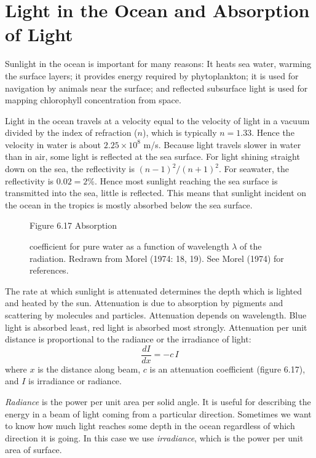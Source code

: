 \section{Light in the Ocean and Absorption of Light}
Sunlight in the ocean is
important for many reasons: It heats sea water, warming the
surface layers; it provides energy required by phytoplankton; it
is used for navigation by animals near the surface; and reflected
subsurface light is used for mapping chlorophyll concentration
from space.

Light in the ocean travels at a velocity equal to the velocity of light in a
vacuum divided by the index of refraction ($n$), which is typically $n = 1.33$.
Hence the velocity in water is about $2.25 \times 10^8$ m/s. Because light
travels slower in water than in air, some light is reflected at the sea surface.
For light shining straight down on the sea, the reflectivity is $(n - 1)^2 /(n +
1)^2 $. For seawater, the reflectivity is $0.02 = 2$\%. Hence most sunlight
reaching the sea surface is transmitted into the sea, little is reflected. This
means that sunlight incident on the ocean in the tropics is mostly absorbed
below the sea surface.

\begin{figure}[t!]
\centering
{}
\footnotesize
Figure 6.17 Absorption \rule{0mm}{3ex}coefficient for pure water as a function of wavelength
$\lambda$ of the radiation. Redrawn from Morel (1974: 18, 19). See Morel (1974) for references.

\label{fig:attenuation}
\vspace{-4ex}
\end{figure}

The rate at which sunlight is attenuated determines the depth which is
lighted and heated by the sun. Attenuation is due to absorption by pigments and
scattering by molecules and particles. Attenuation depends on wavelength.
Blue light is absorbed least, red light is absorbed most strongly.
Attenuation per unit distance is proportional to the radiance or the irradiance of
light:
\begin{equation}
\frac{dI}{dx} = -c \, I
\end{equation}
where $x$ is the distance along beam, $c$ is an attenuation coefficient (figure
6.17), and $I$ is irradiance or radiance.

\textit{Radiance} is the power per unit area per solid angle. It is
useful for describing the energy in a beam of light coming from a particular direction.
Sometimes we want to know how much light reaches some depth in the ocean regardless of which
direction it is going. In this case we use
\textit{irradiance}, which is the power per unit area of surface.

